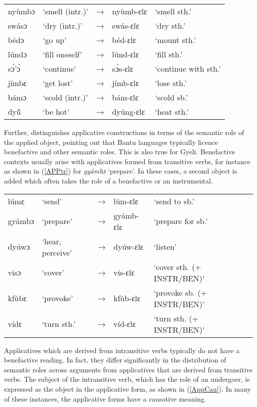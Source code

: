 \begin{exe} \ex \label{APPintr}
\begin{tabular}{lllll}
nyùmbɔ & `smell (intr.)' & → & nyùmb-ɛlɛ & `smell sth.' \\
swásɔ & `dry (intr.)' & → & swás-ɛlɛ & `dry sth.' \\
bédɔ & `go up' & → & béd-ɛlɛ & `mount sth.' \\
lúndɔ & `fill oneself' & → & lúnd-ɛlɛ & `fill sth.' \\
sɔ́'ɔ̀ & `continue' & → & sɔ́s-ɛlɛ & `continue with sth.' \\
jímbɛ & `get lost' & → & jímb-ɛlɛ & `lose sth.' \\
bámɔ & `scold (intr.)' &  → & bám-ɛlɛ & `scold sb.' \\
dyũ̂ & `be hot' & → & dyúng-ɛlɛ & `heat sth.' \\
\end{tabular}
\end{exe} 

\noindent Further, \citet{polinsky2013} distinguishes applicative constructions in terms of the semantic role of the applied object, pointing out that Bantu languages typically licence benefactive and other semantic roles. This is also true for Gyeli. Benefactive contexts usually arise with applicatives formed from transitive verbs, for instance as shown in (\ref{APPtr}) for {\itshape gyámbɔ} `prepare'. In these cases, a second object is added which often takes the role of a benefactive or an instrumental. 

\begin{exe} \ex \label{APPtr}
\begin{tabular}{lllll}
lúmɛ & `send' & → & lúm-ɛlɛ & `send to sb.' \\
gyámbɔ & `prepare' & → & gyámb-ɛlɛ & `prepare for sb.' \\
dyúwɔ & `hear, perceive' & → & dyúw-ɛlɛ & `listen' \\
vísɔ & `cover' & → & vís-ɛlɛ & `cover sth. {\tiny (+ INSTR/BEN)}' \\
kfùbɛ & `provoke' & → & kfùb-ɛlɛ & `provoke sb. {\tiny (+ INSTR/BEN)}' \\
vídɛ & `turn sth.' & → & víd-ɛlɛ & `turn sth. {\tiny (+ INSTR/BEN)}' \\
\end{tabular}
\end{exe} 

Applicatives which are derived from intransitive verbs typically do not have a benefactive reading. In fact, they differ significantly in the distribution of semantic roles across arguments from applicatives that are derived from transitive verbs. The subject of the intransitive verb, which has the role of an undergoer, is expressed as the object in the applicative form, as shown in (\ref{AppCau}). In many of these instances, the applicative forms have a causative meaning.

